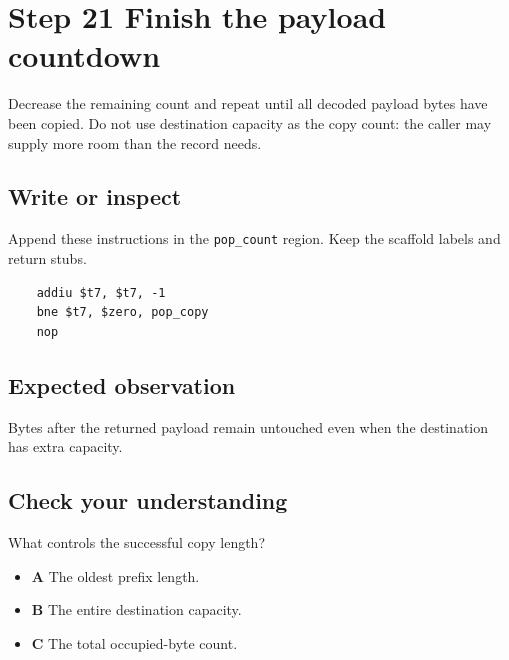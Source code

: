 \section{Step 21 Finish the payload countdown}\label{ring-s21}

Decrease the remaining count and repeat until all decoded payload bytes have been copied. Do not use destination capacity as the copy count: the caller may supply more room than the record needs.

\subsection{Write or inspect}
Append these instructions in the \texttt{pop\_count} region. Keep the scaffold labels and return stubs.

\begin{verbatim}
    addiu $t7, $t7, -1
    bne $t7, $zero, pop_copy
    nop
\end{verbatim}

\subsection{Expected observation}
Bytes after the returned payload remain untouched even when the destination has extra capacity.

\subsection{Check your understanding}
What controls the successful copy length?

\begin{itemize}
  \item \textbf{A} The oldest prefix length.
  \item \textbf{B} The entire destination capacity.
  \item \textbf{C} The total occupied-byte count.
\end{itemize}
